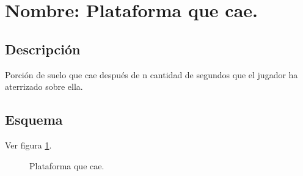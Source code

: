 \section{Nombre: Plataforma que cae.}\label{obs.plataformaD}
	\subsection{Descripción}
	Porción de suelo que cae después de n cantidad de segundos que el jugador ha aterrizado sobre ella.
	\subsection{Esquema}
Ver figura \ref{fig:PlatCae}.
	\begin{figure}
  \centering
  \caption{Plataforma que cae.}
  \label{fig:PlatCae}
\end{figure} 